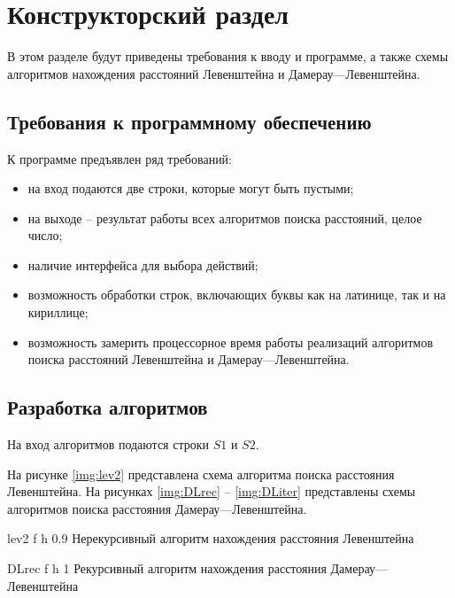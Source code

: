 \chapter{Конструкторский раздел}


В этом разделе будут приведены требования к вводу и программе, а также схемы алгоритмов нахождения расстояний Левенштейна и Дамерау---Левенштейна.

\section{Требования к программному обеспечению}

К программе предъявлен ряд требований:
\begin{itemize}
	\item на вход подаются две строки, которые могут быть пустыми;
	\item на выходе -- результат работы всех алгоритмов поиска расстояний, целое число;
	\item наличие интерфейса для выбора действий;
	\item возможность обработки строк, включающих буквы как на латинице, так и на кириллице;
	\item возможность замерить процессорное время работы реализаций алгоритмов поиска расстояний Левенштейна и Дамерау---Левенштейна.
\end{itemize}


\section{Разработка алгоритмов}

На вход алгоритмов подаются строки $S1$ и $S2$.

На рисунке \ref{img:lev2} представлена схема алгоритма поиска расстояния Левенштейна. На рисунках \ref{img:DLrec} -- \ref{img:DLiter} представлены схемы алгоритмов поиска расстояния Дамерау---Левенштейна.

{lev2} %
{f} %
{h} %
{0.9\textwidth} %
{Нерекурсивный алгоритм нахождения расстояния Левенштейна} %

{DLrec} %
{f} %
{h} %
{1\textwidth} %
{Рекурсивный алгоритм нахождения расстояния Дамерау---Левенштейна} %

